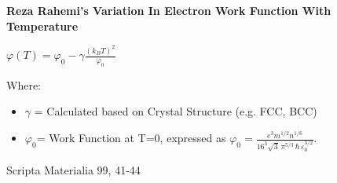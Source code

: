 \documentclass[preview,border=20pt]{standalone}
\begin{document}
\begin{center}
    {\Huge \textbf{Reza Rahemi's Variation In Electron Work Function With Temperature}}

    \vspace{1.5cm}

    {\LARGE $\varphi(T)=\varphi_0-\gamma\frac{(k_BT)^2}{\varphi_0}$}

    \vspace{1cm}

    Where:
    \begin{itemize}
        \item $\gamma$ = Calculated based on Crystal Structure (e.g. FCC, BCC) 
        \item $\varphi_0$= Work Function at T=0, expressed as $\varphi_0 = \frac{e^3 m^{1/2} n^{1/6}}{16^3 \sqrt{3} \, \pi^{5/3} \, \hbar \, \varepsilon_0^{3/2}}$. 

    \end{itemize}

    \vspace{2cm}
    {\Large Scripta Materialia 99, 41-44}
\end{center}
\end{document}
